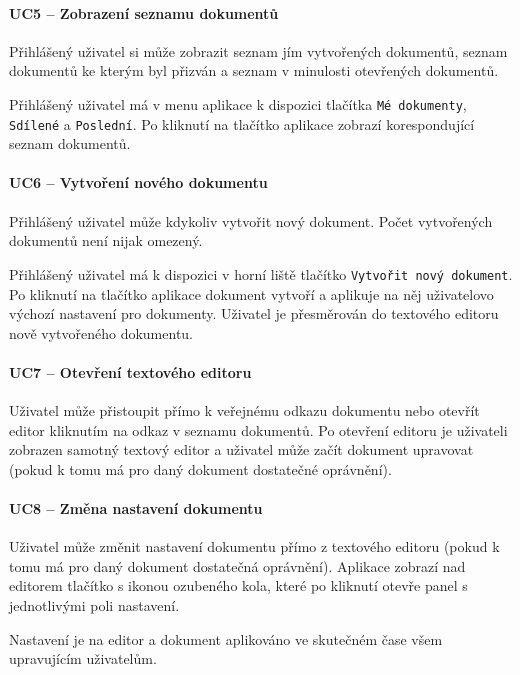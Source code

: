 \paragraph{UC5 -- Zobrazení seznamu dokumentů}

Přihlášený uživatel si může zobrazit seznam jím vytvořených dokumentů, seznam dokumentů ke kterým byl přizván a seznam v minulosti otevřených dokumentů.

Přihlášený uživatel má v menu aplikace k dispozici tlačítka \texttt{Mé dokumenty}, \texttt{Sdílené} a \texttt{Poslední}.
Po kliknutí na tlačítko aplikace zobrazí korespondující seznam dokumentů.

\paragraph{UC6 -- Vytvoření nového dokumentu}

Přihlášený uživatel může kdykoliv vytvořit nový dokument.
Počet vytvořených dokumentů není nijak omezený.

Přihlášený uživatel má k dispozici v horní liště tlačítko \texttt{Vytvořit nový dokument}.
Po kliknutí na tlačítko aplikace dokument vytvoří a aplikuje na něj uživatelovo výchozí nastavení pro dokumenty.
Uživatel je přesměrován do textového editoru nově vytvořeného dokumentu.

\paragraph{UC7 -- Otevření textového editoru}

Uživatel může přistoupit přímo k veřejnému odkazu dokumentu nebo otevřít editor kliknutím na odkaz v seznamu dokumentů.
Po otevření editoru je uživateli zobrazen samotný textový editor a uživatel může začít dokument upravovat (pokud k tomu má pro daný dokument dostatečné oprávnění).

\paragraph{UC8 -- Změna nastavení dokumentu}

Uživatel může změnit nastavení dokumentu přímo z textového editoru (pokud k tomu má pro daný dokument dostatečná oprávnění).
Aplikace zobrazí nad editorem tlačítko s ikonou ozubeného kola, které po kliknutí otevře panel s jednotlivými poli nastavení.

Nastavení je na editor a dokument aplikováno ve skutečném čase všem upravujícím uživatelům.

